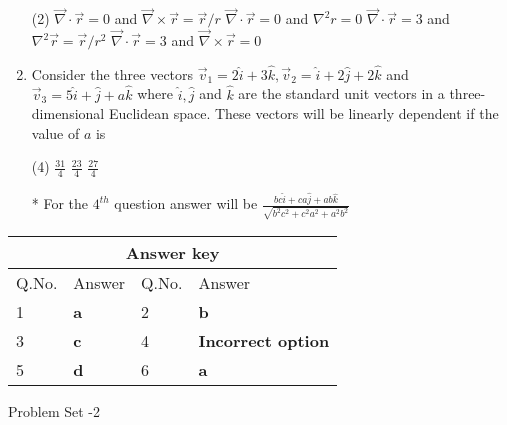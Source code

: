 \begin{enumerate}[label=\color{ocre}\textbf{\arabic*.}]
\begin{tasks}(2)
	\task[\textbf{A.}] $\vec{\nabla} \cdot \vec{r}=0$ and $\vec{\nabla} \times \vec{r}=\vec{r} / r$
	\task[\textbf{B.}] $\vec{\nabla} \cdot \vec{r}=0$ and $\nabla^{2} r=0$
	\task[\textbf{C.}] $\vec{\nabla} \cdot \vec{r}=3$ and $\nabla^{2} \vec{r}=\vec{r} / r^{2}$
	\task[\textbf{D.}] $\vec{\nabla} \cdot \vec{r}=3$ and $\vec{\nabla} \times \vec{r}=0$
\end{tasks}
\item Consider the three vectors $\vec{v}_{1}=2 \hat{i}+3 \hat{k}, \vec{v}_{2}=\hat{i}+2 \hat{j}+2 \hat{k}$ and $\vec{v}_{3}=5 \hat{i}+\hat{j}+a \hat{k}$ where $\hat{i}, \hat{j}$ and $\hat{k}$ are the standard unit vectors in a three-dimensional Euclidean space. These vectors will be linearly dependent if the value of $a$ is
{}

\begin{tasks}(4)
	\task[\textbf{A.}] $\frac{31}{4}$
	\task[\textbf{B.}] $\frac{23}{4}$
	\task[\textbf{C.}] $\frac{27}{4}$
\end{tasks}
\begin{note}
	* For the $4^{th}$ question answer will be $\frac{b c \hat{i}+c a \hat{j}+a b \hat{k}}{\sqrt{b^{2} c^{2}+c^{2} a^{2}+a^{2} b^{2}}}$
\end{note}
\end{enumerate}
\setlength\arrayrulewidth{1pt}
\begin{table}[H]
	\centering
	\begin{tabular}{|p{1.5cm}|p{1.5cm}||p{1.5cm}|p{1.5cm}|}
		\hline
		\multicolumn{4}{|c|}{\textbf{Answer key}}\\\hline\hline
		\rowcolor{ocrel}Q.No.&Answer&Q.No.&Answer\\\hline
		1&\textbf{a} &2&\textbf{b}\\\hline 
		3&\textbf{c} &4&\textbf{Incorrect option} \\\hline
		5&\textbf{d} &6&\textbf{a} \\\hline
		
		
	\end{tabular}
\end{table}
\begin{abox}
	Problem Set -2
\end{abox}	

